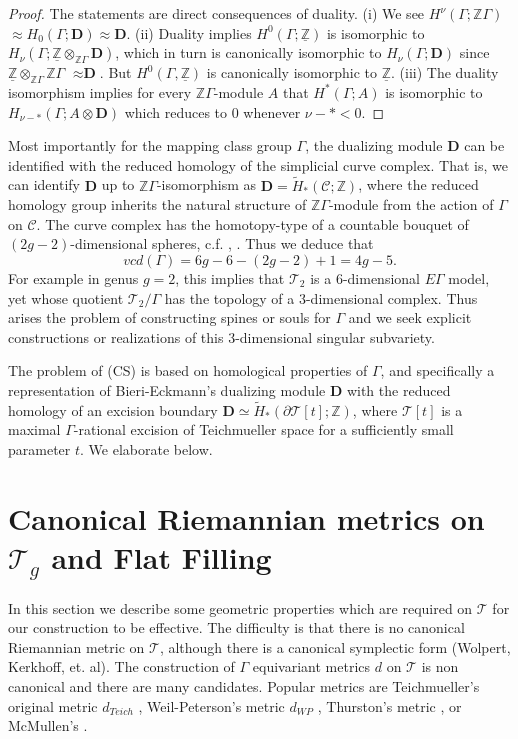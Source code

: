 \documentclass[12pt]{amsart}
\theoremstyle{definition}
\theoremstyle{remark}
\newcommand{\bZ}{\mathbb{Z}}
\newcommand{\del}{\partial}
\newcommand{\bD}{\textbf{D}}
\newcommand{\sC}{\mathscr{C}}
\newcommand{\sT}{\mathscr{T}}
\begin{document}
\begin{proof} 
The statements are direct consequences of duality. (i) We see $H^\nu(\Gamma; \bZ \Gamma)$ $\approx H_0(\Gamma; \bD)\approx \textbf{D}$. (ii) Duality implies $H^0(\Gamma; \underline{\bZ} )$ is isomorphic to $H_\nu(\Gamma; \underline{\bZ} \otimes_{\bZ \Gamma} \bD)$, which in turn is canonically isomorphic to $H_\nu(\Gamma; \bD)$ since $\underline{\bZ}\otimes_{\bZ \Gamma} \bZ \Gamma$ $\approx \bD$. But $H^0(\Gamma, \underline{\bZ})$ is canonically isomorphic to $\underline{\bZ}$. (iii) The duality isomorphism implies for every $\bZ \Gamma$-module $A$ that $H^*(\Gamma; A)$ is isomorphic to $H_{\nu-*}(\Gamma; A \otimes \bD)$ which reduces to $0$ whenever $\nu-*<0$.
\end{proof}

Most importantly for the mapping class group $\Gamma$, the dualizing module $\bD$ can be identified with the reduced homology of the simplicial curve complex. That is, we can identify $\bD$ up to $\bZ\Gamma$-isomorphism as $\bD=\tilde{H}_*(\sC;\bZ)$, where the reduced homology group inherits the natural structure of $\bZ \Gamma$-module from the action of $\Gamma$ on $\sC$. The curve complex has the homotopy-type of a countable bouquet of $(2g-2)$-dimensional spheres, c.f. \cite{ivanov2015virtual}, \cite{Harer1986}. Thus we deduce that $$vcd(\Gamma)=6g-6-(2g-2)+1=4g-5.$$ For example in genus $g=2$, this implies that $\sT_2$ is a $6$-dimensional $E\Gamma$ model, yet whose quotient $\sT_2/\Gamma$ has the topology of a $3$-dimensional complex. Thus arises the problem of constructing spines or souls for $\Gamma$ and we seek explicit constructions or realizations of this $3$-dimensional singular subvariety. 

The problem of (CS) is based on homological properties of $\Gamma$, and specifically a representation of Bieri-Eckmann's dualizing module $\bD$ with the reduced homology of an excision boundary $\bD\simeq \tilde{H}_*(\del \sT[t]; \bZ)$, where $\sT[t]$ is a maximal $\Gamma$-rational excision of Teichmueller space for a sufficiently small parameter $t$. We elaborate below.

\section{Canonical Riemannian metrics on $\sT_g$ and Flat Filling}\label{s2}
In this section we describe some geometric properties which are required on $\sT$ for our construction to be effective. The difficulty is that there is no canonical Riemannian metric on $\sT$, although there is a canonical symplectic form (Wolpert, Kerkhoff, et. al). The construction of $\Gamma$ equivariant metrics $d$ on $\sT$ is non canonical and there are many candidates. Popular metrics are Teichmueller's original metric $d_{Teich}$ \cite{hubbard},  Weil-Peterson's metric $d_{WP}$ \cite{hubbard}, Thurston's metric \cite{wolpert1986a}, or McMullen's \cite{mcmullen2000moduli}. 
\end{document}
